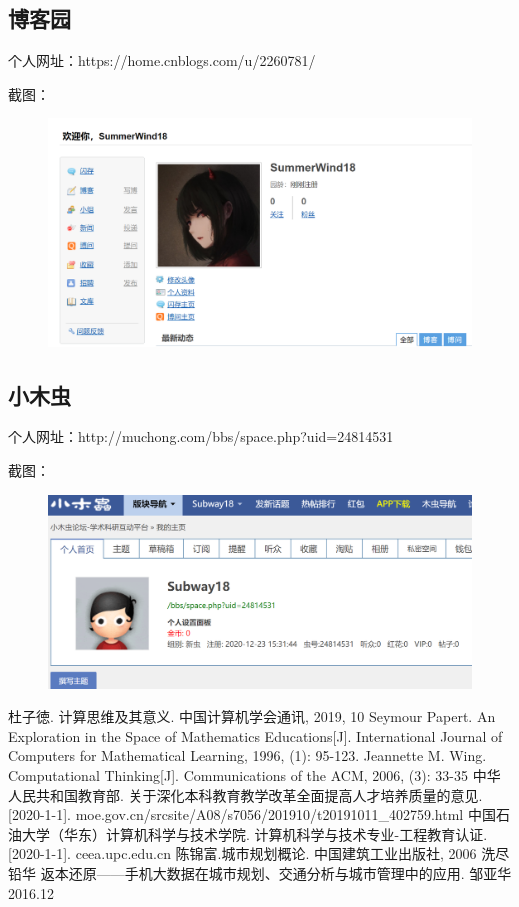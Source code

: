 \documentclass{article}
\begin{document}
\subsection{博客园}

个人网址：https://home.cnblogs.com/u/2260781/

截图：
\begin{figure}[H]
    \centering
    \includegraphics[scale=0.5]{blog}
    \label{fig:blog}
\end{figure}

\subsection{小木虫}

个人网址：http://muchong.com/bbs/space.php?uid=24814531

截图：
\begin{figure}[H]
    \centering
    \includegraphics[scale=0.5]{xmc}
    \label{fig:xmc}
\end{figure}

\begin{thebibliography}{9}
     杜子徳. 计算思维及其意义. 中国计算机学会通讯, 2019, 10
     Seymour Papert. An Exploration in the Space of Mathematics Educations[J]. International Journal of Computers for Mathematical Learning, 1996, (1): 95-123.
     Jeannette M. Wing. Computational Thinking[J]. Communications of the ACM, 2006, (3): 33-35
     中华人民共和国教育部. 关于深化本科教育教学改革全面提高人才培养质量的意见. [2020-1-1]. moe.gov.cn/srcsite/A08/s7056/201910/t20191011\_402759.html
     中国石油大学（华东）计算机科学与技术学院. 计算机科学与技术专业-工程教育认证. [2020-1-1]. ceea.upc.edu.cn
     陈锦富.城市规划概论. 中国建筑工业出版社, 2006
     洗尽铅华 返本还原——手机大数据在城市规划、交通分析与城市管理中的应用. 邹亚华 2016.12

\end{thebibliography}
\end{document}
